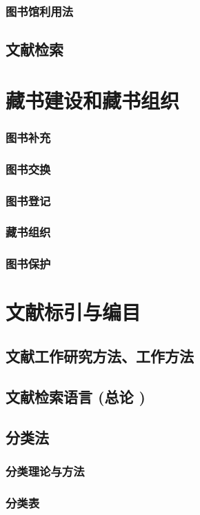 \documentclass[UTF8]{../../ApplicationUniverse}
\begin{document}
        \subsubsection{图书馆利用法}
    \subsection{文献检索}

\section{藏书建设和藏书组织}
    \subsubsection{图书补充}
    \subsubsection{图书交换}
    \subsubsection{图书登记}
    \subsubsection{藏书组织}
    \subsubsection{图书保护}

\section{文献标引与编目}
    \subsection{文献工作研究方法、工作方法}
    \subsection{文献检索语言 (总论 )}
    \subsection{分类法}
        \subsubsection{分类理论与方法}
        \subsubsection{分类表}
\end{document}
